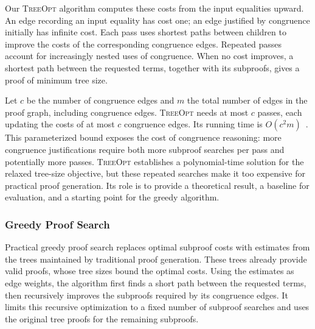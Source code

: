 Our \textsc{TreeOpt} algorithm computes these costs from the input equalities upward.
An edge recording an input equality has cost one;
  an edge justified by congruence initially has infinite cost.
Each pass uses shortest paths between children to improve the costs
  of the corresponding congruence edges.
Repeated passes account for increasingly nested uses of congruence.
When no cost improves, a shortest path between the requested terms,
  together with its subproofs, gives a proof of minimum tree size.

Let $c$ be the number of congruence edges and $m$ the total number of edges
  in the proof graph, including congruence edges.
\textsc{TreeOpt} needs at most $c$ passes,
  each updating the costs of at most $c$ congruence edges.
Its running time is $O(c^2m)$~\cite{eggproof}.
This parameterized bound exposes the cost of congruence reasoning:
  more congruence justifications require both more subproof searches per pass
  and potentially more passes.
\textsc{TreeOpt} establishes a polynomial-time solution for the relaxed tree-size objective,
  but these repeated searches make it too expensive for practical proof generation.
Its role is to provide a theoretical result, a baseline for evaluation,
  and a starting point for the greedy algorithm.

\subsubsection{Greedy Proof Search}
\label{sec:greedy-proofs}

Practical greedy proof search replaces optimal subproof costs with estimates
  from the trees maintained by traditional proof generation.
These trees already provide valid proofs, whose tree sizes bound the optimal costs.
Using the estimates as edge weights, the algorithm first finds a short path
  between the requested terms, then recursively improves the subproofs
  required by its congruence edges.
It limits this recursive optimization to a fixed number of subproof searches
  and uses the original tree proofs for the remaining subproofs.

